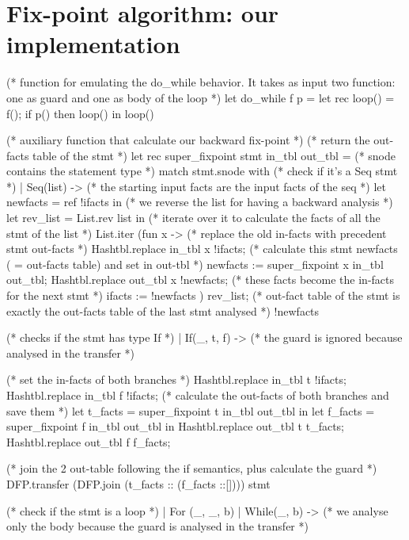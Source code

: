 \documentclass[a4paper]{article}   %
\begin{document}
\clearpage
\section{Fix-point algorithm: our implementation}
\label{ourFixCode}


\begin{ocaml}
(* function for emulating the do_while behavior. It takes as input two function: one as guard and one as body of the loop *)
let do_while f p =
  let rec loop() =
    f();
    if p() then loop()
  in
  loop()

(* auxiliary function that calculate our backward fix-point *)
(* return the out-facts table of the stmt *)
let rec super_fixpoint stmt in_tbl out_tbl =
	(* snode contains the statement type *)
	match stmt.snode with
	(* check if it's a Seq stmt *)
	| Seq(list) -> 
    	(* the starting input facts are the input facts of the seq *)
    	let newfacts = ref !ifacts in
    	(* we reverse the list for having a backward analysis *)
    	let rev_list = List.rev list in
    	(* iterate over it to calculate the facts of all the stmt of the list *)
      	List.iter (fun x -> 
      			(* replace the old in-facts with precedent stmt out-facts *)
      			Hashtbl.replace in_tbl x !ifacts; 
      	    	(* calculate this stmt newfacts ( = out-facts table) and set in out-tbl *)
      			newfacts := super_fixpoint x in_tbl out_tbl;
      			Hashtbl.replace out_tbl x !newfacts;
    			(* these facts become the in-facts for the next stmt *)
      			ifacts := !newfacts
      	) rev_list;
    	(* out-fact table of the stmt is exactly the out-facts table of the last stmt analysed *)
    	!newfacts
				
	(* checks if the stmt has type If *)
    | If(_, t, f) -> 
    	(* the guard is ignored because analysed in the transfer *)
    				
    	(* set the in-facts of both branches *)
    	Hashtbl.replace in_tbl t !ifacts;
    	Hashtbl.replace in_tbl f !ifacts;
    	(* calculate the out-facts of both branches and save them *)
    	let t_facts = super_fixpoint t in_tbl out_tbl in
    	let f_facts = super_fixpoint f in_tbl out_tbl in
    	Hashtbl.replace out_tbl t t_facts;
    	Hashtbl.replace out_tbl f f_facts;
    
    	(* join the 2 out-table following the if semantics, plus calculate the guard *)
    	DFP.transfer (DFP.join (t_facts :: (f_facts ::[]))) stmt 
			
	(* check if the stmt is a loop *)
    | For (_, _, b)		
    | While(_, b) ->
    	(* we analyse only the body because the guard is analysed in the transfer *)
    				

\end{ocaml}
\end{document}
